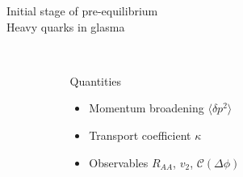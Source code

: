 \documentclass[aspectratio=169,11pt,usenames,dvipsnames]{beamer}
\begin{document}
\begin{frame}{}
    \begin{center}
        \vspace{1cm}
        {\large\color{normal}Initial stage of pre-equilibrium}\\[0.3cm]
        {\huge\color{destacado}Heavy quarks in glasma}\\[0.3cm]
        {\large\color{normal}
        \begin{center}
            \begin{columns}
                \begin{column}{0.066\textwidth}\end{column}
                \begin{column}{0.45\textwidth}
                    \centering
                    \\[10pt]
                    {\Large\color{pinky} Quantities}
                    \begin{itemize}
                        \item Momentum broadening $\langle \delta p^2\rangle$
                        \item Transport coefficient $\kappa$
                        \item Observables $R_{AA}$, $v_2$, $\mathcal{C}(\Delta\phi)$
                    \end{itemize}
                \end{column}
                \begin{column}{0.066\textwidth}\end{column}
                \begin{column}{0.35\textwidth}
                    \centering

\end{column}
\end{columns}
\end{center}}
\end{center}
\end{frame}
\end{document}
